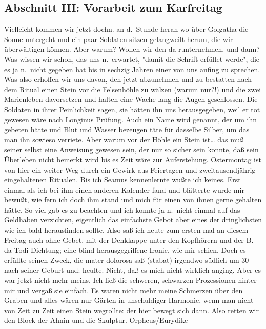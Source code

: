 \documentclass[
]{article}
\author{}
\date{\vspace{-2.5em}}
\begin{document}
\subsection{Abschnitt III: Vorarbeit zum
Karfreitag}\label{abschnitt-iii-vorarbeit-zum-karfreitag}

Vielleicht kommen wir jetzt dochn. an d.~Stunde heran wo über Golgatha
die Sonne untergeht und ein paar Soldaten sitzen gelangweilt herum, die
wir überwältigen können. Aber warum? Wollen wir den da runternehmen, und
dann? Was wissen wir schon, das uns n.~erwartet, "damit die Schrift
erfüllet werde", die es ja n.~nicht gegeben hat bis in sechzig Jahren
einer von uns anfing zu sprechen. Was also erhoffen wir uns davon, den
jetzt abzunehmen und zu bestatten nach dem Ritual einen Stein vor die
Felsenhöhle zu wälzen (warum nur?!) und die zwei Marienleben davorsetzen
und halten eine Wache lang die Augen geschlossen. Die Soldaten in ihrer
Peinlichkeit sagen, sie hätten ihn uns herausgegeben, weil er tot
gewesen wäre nach Longinus Prüfung. Auch ein Name wird genannt, der um
ihn gebeten hätte und Blut und Wasser bezeugen täte für dasselbe Silber,
um das man ihn sowieso verriete. Aber warum vor der Höhle ein Stein
ist\ldots{} das muß seiner selbst eine Anweisung gewesen sein, der nur
so sicher sein konnte, daß sein Überleben nicht bemerkt wird bis es Zeit
wäre zur Auferstehung. Ostermontag ist von hier ein weiter Weg durch ein
Gewirk aus Feiertagen und zweitausendjährig eingehaltenen Ritualen. Bis
ich Seamus kennenlernte wußte ich keines. Erst einmal als ich bei ihm
einen anderen Kalender fand und blätterte wurde mir bewußt, wie fern ich
doch ihm stand und mich für einen von ihnen gerne gehalten hätte. So
viel gab es zu beachten und ich konnte ja n.~nicht einmal auf das
Geldhaben verzichten, eigentlich das einfachste Gebot aber eines der
dringlichsten wie ich bald herausfinden sollte. Also saß ich heute zum
ersten mal an diesem Freitag auch ohne Gebet, mit der Denkkappe unter
den Kopfhörern und der B.-da-Todi Dichtung; eine blind herausgegriffene
Ironie, wie mir schien. Doch es erfüllte seinen Zweck, die mater
dolorosa saß (stabat) irgendwo südlich um 30 nach seiner Geburt und:
heulte. Nicht, daß es mich nicht wirklich anging. Aber es war jetzt
nicht mehr meins. Ich ließ die schweren, schwarzen Prozessionen hinter
mir und vergaß sie einfach. Es waren nicht mehr meine Schmerzen über den
Graben und alles wären nur Gärten in unschuldiger Harmonie, wenn man
nicht von Zeit zu Zeit einen Stein wegrollte: der hier bewegt sich dann.
Also retten wir den Block der Ahnin und die Skulptur. Orpheus/Eurydike
\end{document}
